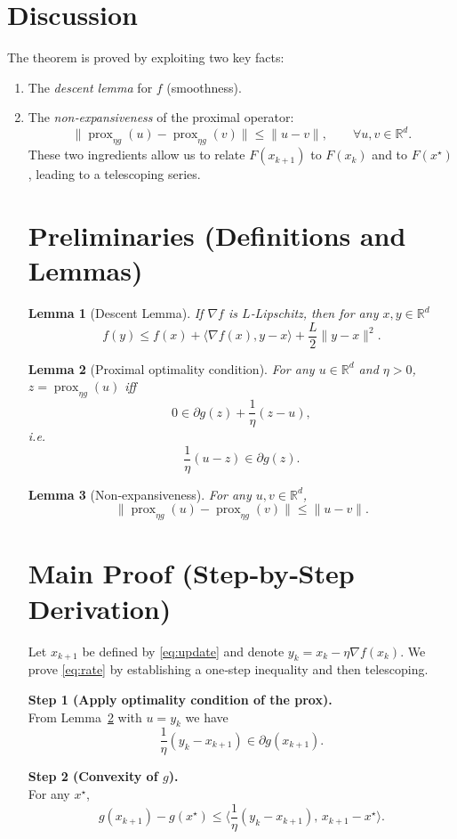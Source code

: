 \documentclass{article}
\newtheorem{lemma}{Lemma}
\newcommand{\prox}{\operatorname{prox}}
\newcommand{\R}{\mathbb{R}}
\begin{document}
\section*{Discussion}
The theorem is proved by exploiting two key facts:
\begin{enumerate}
\item The \emph{descent lemma} for $f$ (smoothness).
\item The \emph{non‑expansiveness} of the proximal operator:
\[
\|\prox_{\eta g}(u)-\prox_{\eta g}(v)\|\le\|u-v\|,\qquad\forall u,v\in\R^{d}.
\tag{NE}
\]
These two ingredients allow us to relate $F(x_{k+1})$ to $F(x_{k})$ and to $F(x^{\star})$, leading to a telescoping series.

\newpage
\section*{Preliminaries (Definitions and Lemmas)}
\begin{lemma}[Descent Lemma]\label{lem:descent}
If $\nabla f$ is $L$‑Lipschitz, then for any $x,y\in\R^{d}$
\[
f(y)\le f(x)+\langle\nabla f(x),y-x\rangle+\frac{L}{2}\|y-x\|^{2}.
\]
\end{lemma}
\begin{lemma}[Proximal optimality condition]\label{lem:prox_opt}
For any $u\in\R^{d}$ and $\eta>0$, $z=\prox_{\eta g}(u)$ iff
\[
0\in \partial g(z)+\frac{1}{\eta}(z-u),
\]
i.e.
\[
\frac{1}{\eta}(u-z)\in \partial g(z).
\tag{PO}
\]
\end{lemma}
\begin{lemma}[Non‑expansiveness]\label{lem:nonexp}
For any $u,v\in\R^{d}$,
\[
\|\prox_{\eta g}(u)-\prox_{\eta g}(v)\|\le\|u-v\|.
\tag{NE}
\]
\end{lemma}

\section*{Main Proof (Step‑by‑Step Derivation)}
Let $x_{k+1}$ be defined by \eqref{eq:update} and denote $y_{k}=x_{k}-\eta\nabla f(x_{k})$.
We prove \eqref{eq:rate} by establishing a one‑step inequality and then telescoping.

\bigskip
\noindent\textbf{Step 1 (Apply optimality condition of the prox).}\\
From Lemma~\ref{lem:prox_opt} with $u=y_{k}$ we have
\[
\frac{1}{\eta}(y_{k}-x_{k+1})\in\partial g(x_{k+1}).
\tag{S1}
\]

\noindent\textbf{Step 2 (Convexity of $g$).}\\
For any $x^{\star}$,
\[
g(x_{k+1})-g(x^{\star})\le
\Big\langle\frac{1}{\eta}(y_{k}-x_{k+1}),\,x_{k+1}-x^{\star}\Big\rangle .
\tag{S2}
\]


\end{enumerate}
\end{document}
